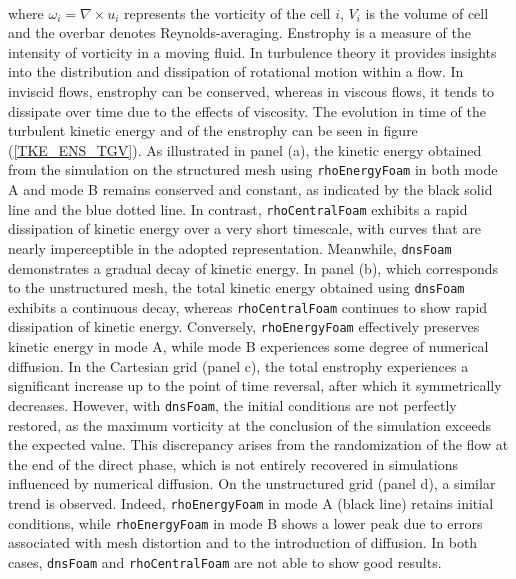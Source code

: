 \documentclass[a5paper]{sapthesis}
\begin{document}
	\\
	where $\omega_i = \nabla \times u_i$ represents the vorticity of the cell $i$, $V_i$ is the volume of cell and the overbar denotes Reynolds-averaging. Enstrophy is a measure of the intensity of vorticity in a moving fluid. In turbulence theory it provides insights into the distribution and dissipation of rotational motion within a flow. In inviscid flows, enstrophy can be conserved, whereas in viscous flows, it tends to dissipate over time due to the effects of viscosity.	The evolution in time of the turbulent kinetic energy and of the enstrophy can be seen in figure (\ref{TKE_ENS_TGV}). As illustrated in panel (a), the kinetic energy obtained from the simulation on the structured mesh using \texttt{rhoEnergyFoam} in both mode A and mode B remains conserved and constant, as indicated by the black solid line and the blue dotted line. In contrast, \texttt{rhoCentralFoam} exhibits a rapid dissipation of kinetic energy over a very short timescale, with curves that are nearly imperceptible in the adopted representation. Meanwhile, \texttt{dnsFoam} demonstrates a gradual decay of kinetic energy. In panel (b), which corresponds to the unstructured mesh, the total kinetic energy obtained using \texttt{dnsFoam} exhibits a continuous decay, whereas \texttt{rhoCentralFoam} continues to show rapid dissipation of kinetic energy. Conversely, \texttt{rhoEnergyFoam} effectively preserves kinetic energy in mode A, while mode B experiences some degree of numerical diffusion.
	In the Cartesian grid (panel c), the total enstrophy experiences a significant increase up to the point of time reversal, after which it symmetrically decreases. However, with \texttt{dnsFoam}, the initial conditions are not perfectly restored, as the maximum vorticity at the conclusion of the simulation exceeds the expected value. This discrepancy arises from the randomization of the flow at the end of the direct phase, which is not entirely recovered in simulations influenced by numerical diffusion. On the unstructured grid (panel d), a similar trend is observed. Indeed, \texttt{rhoEnergyFoam} in mode A (black line) retains initial conditions, while \texttt{rhoEnergyFoam} in mode B shows a lower peak due to errors associated with mesh distortion and to the introduction of diffusion. In both cases, \texttt{dnsFoam} and \texttt{rhoCentralFoam} are not able to show good results.
	
\end{document}

